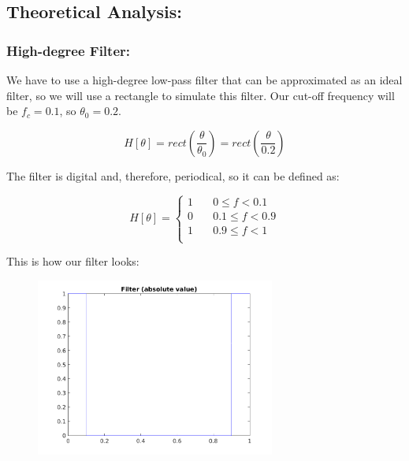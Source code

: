 \documentclass[a4paper,11pt]{article}
\begin{document}
\newpage

\subsection{Theoretical Analysis:}

\subsubsection{High-degree Filter:}

We have to use a high-degree low-pass filter that can be approximated as an
ideal filter, so we will use a rectangle to simulate this filter. Our cut-off
frequency will be $f_c = 0.1$, so $\theta_0 = 0.2$.

\begin{equation}\label{eq:High_Filter}
  H[\theta] = rect(\frac{\theta}{\theta_0}) = rect(\frac{\theta}{0.2})
\end{equation}

The filter is digital and, therefore, periodical, so it can be defined as:

\begin{equation}\label{eq:H_hd_th}
  H[\theta] =
   \begin{cases}
       1 &\quad 0 \le f < 0.1\\
       0 &\quad 0.1 \le f < 0.9\\
       1 &\quad 0.9 \le f < 1\\
   \end{cases}
\end{equation}

This is how our filter looks:

\begin{figure}[!hp]
    \begin{center}
      \includegraphics[width=0.7\textwidth]{images/study1/H_hd_th.png}
    \end{center}
\end{figure}
\end{document}
